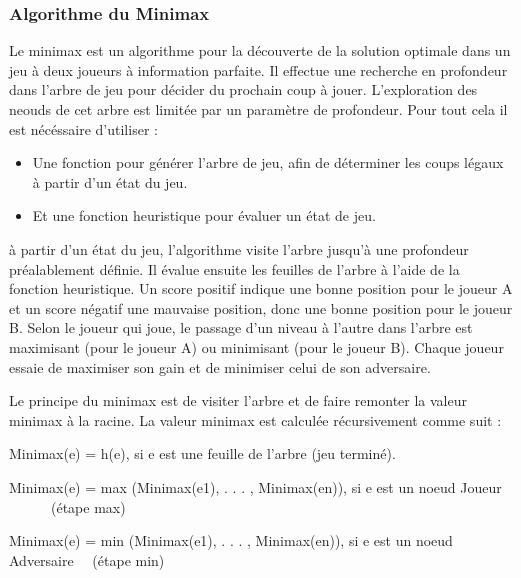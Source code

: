\documentclass[11pt]{article}
\newcommand{\tmtextit}[1]{{\itshape{#1}}}
\newenvironment{itemizedot}{\begin{itemize} \renewcommand{\labelitemi}{$\bullet$}\renewcommand{\labelitemii}{$\bullet$}\renewcommand{\labelitemiii}{$\bullet$}\renewcommand{\labelitemiv}{$\bullet$}}{\end{itemize}}
\begin{document}
\subsubsection{Algorithme du Minimax}

Le minimax est un algorithme pour la découverte de la solution optimale
dans un jeu à deux joueurs à information parfaite. Il effectue une
recherche en profondeur dans l'arbre de jeu pour décider du prochain coup
à jouer. L'exploration des neouds de cet arbre est limitée par un
paramètre de profondeur. Pour tout cela il est nécéssaire
d'utiliser :

\begin{itemizedot}
  \item Une fonction pour générer l'arbre de jeu, afin de
  déterminer les coups légaux à partir d'un état du jeu.
  
  \item Et une fonction heuristique pour évaluer un état de jeu.
\end{itemizedot}

à partir d'un état du jeu, l'algorithme visite l'arbre jusqu'à une
profondeur préalablement définie. Il évalue ensuite les feuilles
de l'arbre à l'aide de la fonction heuristique. Un score positif indique
une bonne position pour le joueur A et un score négatif une mauvaise
position, donc une bonne position pour le joueur B. Selon le joueur qui joue,
le passage d'un niveau à l'autre dans l'arbre est maximisant (pour le
joueur A) ou minimisant (pour le joueur B). Chaque joueur essaie de maximiser
son gain et de minimiser celui de son adversaire.

Le principe du minimax est de visiter l'arbre et de faire remonter la valeur
minimax à la racine. La valeur minimax est calculée récursivement
comme suit :

\begin{itemizedot}
  \tmtextit{\item Minimax(e) = h(e), si e est une feuille de l'arbre (jeu
  terminé).
  
  \item Minimax(e) = max (Minimax(e1), . . . , Minimax(en)), si e est un noeud
  Joueur \ \ \ \ \ \ (étape max)
  
  \item Minimax(e) = min (Minimax(e1), . . . , Minimax(en)), si e est un noeud
  Adversaire \ \ (étape min)}
\end{itemizedot}

{\noindent}{\noindent}
\begin{tabular}{l}

\end{tabular}{\hspace*{\fill}}{\smallskip}
\end{document}
